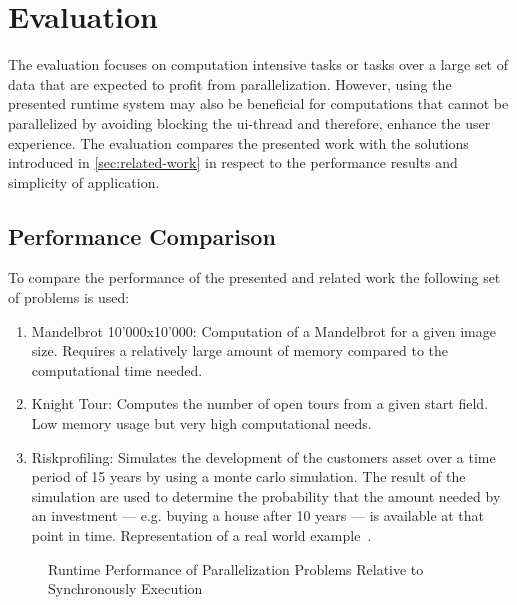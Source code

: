 \section{Evaluation}\label{sec:evaluation}
The evaluation focuses on computation intensive tasks or tasks over a large set of data that are expected to profit from parallelization. However, using the presented runtime system may also be beneficial for computations that cannot be parallelized by avoiding blocking the ui-thread and therefore, enhance the user experience. The evaluation compares the presented work with the solutions introduced in \cref{sec:related-work} in respect to the performance results and simplicity of application. 

\subsection{Performance Comparison}
To compare the performance of the presented and related work the following set of problems is used:

\begin{enumerate}
	\item Mandelbrot 10'000x10'000: Computation of a Mandelbrot for a given image size. Requires a relatively large amount of memory compared to the computational time needed.
	\item Knight Tour: Computes the number of open tours from a given start field. Low memory usage but very high computational needs.
	\item Riskprofiling: Simulates the development of the customers asset over a time period of 15 years by using a monte carlo simulation. The result of the simulation are used to determine the probability that the amount needed by an investment --- e.g. buying a house after 10 years --- is available at that point in time. Representation of a real world example~\cite{Kwsoft2016}.
\end{enumerate}

\begin{figure*}
		
	\caption{Runtime Performance of Parallelization Problems Relative to Synchronously Execution}
	\label{fig:runtime-performance}
\end{figure*}

